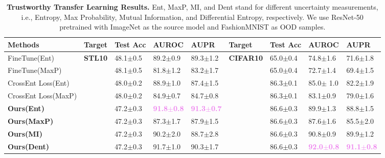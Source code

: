 \begin{table}[t]
  \begin{center}
  \scriptsize
  \captionsetup{font=small}
  \caption{\textbf{Trustworthy Transfer Learning Results.} Ent, MaxP, MI, and Dent stand for different uncertainty measurements, i.e., Entropy, Max Probability, Mutual Information, and Differential Entropy, respectively. We use ResNet-50 pretrained with ImageNet as the source model and FashionMNIST as OOD samples.}
  \vspace{-1.5em}
  \begin{tabular}{lllllllll}
    \\
    \toprule
    \textbf{Methods} &\textbf{Target} &\textbf{Test Acc} & \textbf{AUROC} & \textbf{AUPR}& \textbf{Target} &\textbf{Test Acc}& \textbf{AUROC} &  \textbf{AUPR} \\
    \hline
    FineTune(Ent)  &\textbf{STL10} &48.1$\pm$0.5  & 89.2$\pm$0.9 & 89.3$\pm$1.2 & \textbf{CIFAR10} &65.0$\pm$0.4 &74.8$\pm$1.6 &71.6$\pm$1.8  \\
    FineTune(MaxP) &               &48.1$\pm$0.5  & 81.8$\pm$1.2 & 83.2$\pm$1.7 &                  &65.0$\pm$0.4 &72.7$\pm$1.4&69.4$\pm$1.5  \\
    \hline
    CrossEnt Loss(Ent)  &    &48.0$\pm$0.2  & 88.9$\pm$1.0 & 87.4$\pm$1.5 &  &86.3$\pm$0.1 &85.0$\pm$ 1.0& 82.2$\pm$1.9  \\
    CrossEnt Loss(MaxP) &               &48.0$\pm$0.2  & 84.9$\pm$0.7 & 84.7$\pm$0.8 &                  &86.3$\pm$0.1 &83.1$\pm$0.9& 79.0$\pm$1.6  \\
    \hline
    \textbf{Ours(Ent)} &          &47.2$\pm$0.3 & \textcolor{violet}{\textbf{91.8$\pm$0.8}} & \textcolor{violet}{\textbf{91.3$\pm$0.7}} &  &86.6$\pm$0.3 &89.9$\pm$1.3&88.8$\pm$1.5\\
    \textbf{Ours(MaxP)}&          &47.2$\pm$0.3 & 87.3$\pm$1.7 & 87.9$\pm$1.5 &  &86.6$\pm$0.3 &87.6$\pm$1.6&85.5$\pm$2.0  \\
     \textbf{Ours(MI)} &        &47.2$\pm$0.3 & 90.2$\pm$2.0 & 88.7$\pm$2.8 &  &86.6$\pm$0.3 &90.8$\pm$0.9&89.9$\pm$1.2\\
    \textbf{Ours(Dent)}&        &47.2$\pm$0.3 & 91.7$\pm$1.0 & 90.3$\pm$1.7 &  &86.6$\pm$0.3 &\textcolor{violet}{\textbf{92.0$\pm$0.8}}& \textcolor{violet}{\textbf{91.1$\pm$0.8}}\\
    \toprule
  \end{tabular}
  \label{table:transfer}
  \end{center}
  \vspace{-1.5em}
\end{table}

